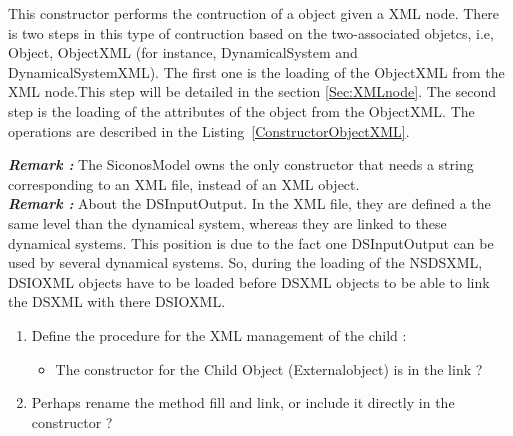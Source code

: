 This constructor performs  the contruction of a object given a XML node. There is two steps in this type of contruction  based on the two-associated objetcs, i.e, Object, ObjectXML (for instance, DynamicalSystem and DynamicalSystemXML). The first one is the loading of the ObjectXML from the XML node.This step will be detailed in the section \ref{Sec:XMLnode}. The second  step is the loading of the attributes of the object from the ObjectXML. The operations are described in the Listing~\ref{ConstructorObjectXML}.



\textbf{\textit{Remark :}} The SiconosModel owns the only constructor that needs a string corresponding to an XML file, instead of an XML object.\\
\textbf{\textit{Remark :}} About the DSInputOutput. In the XML file, they are defined a the same level than the dynamical system, whereas they are linked to these dynamical systems. This position is due to the fact one DSInputOutput can be used by several dynamical systems. So, during the loading of the NSDSXML,  DSIOXML objects have to be loaded before DSXML objects to be able to link the DSXML with there DSIOXML.\\



 \begin{ndr}
   \begin{enumerate}
   \item Define the procedure for the XML management of the child :
     \begin{itemize}
     \item The constructor for the Child Object (Externalobject) is in the link ?
     \end{itemize}
   \item Perhaps rename the method fill and link, or include it directly in the constructor ?
   \end{enumerate}
 \end{ndr}

